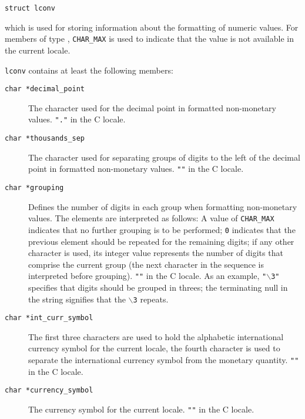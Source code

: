   \begin{Verbatim}
struct lconv
\end{Verbatim}

  which is used for storing information about  the  formatting
   of numeric values.  For members of type \kchar,
   \texttt{CHAR\_MAX} is used to indicate that the value is not available in
   the current locale.


  \texttt{lconv} contains at least the following members:


  \begin{description}
   \item[\texttt{char *decimal\_point}] The character used for the  decimal  point  in  formatted
    non-monetary values.  \texttt{"."} in the C locale.

   \item[\texttt{char *thousands\_sep}] The character used for separating groups of digits to the
    left  of  the  decimal  point  in  formatted non-monetary
    values. \texttt{""} in the C locale.

   \item[\texttt{char *grouping}] Defines  the  number  of  digits  in  each   group   when
    formatting   non-monetary   values.    The  elements  are
    interpreted as follows: A  value  of  \texttt{CHAR\_MAX}  indicates
    that  no further grouping is to be performed; \texttt{0} indicates
    that the previous element  should  be  repeated  for  the
    remaining  digits;  if  any  other character is used, its
    integer  value  represents  the  number  of  digits  that
    comprise  the  current  group  (the next character in the
    sequence is interpreted before grouping).  \texttt{""}  in  the  C
    locale.  As an example, \texttt{"$\backslash$3"} specifies that digits should
    be grouped in threes; the terminating null in the  string
    signifies that the \texttt{$\backslash$3} repeats.

   \item[\texttt{char *int\_curr\_symbol}] The  first  three  characters  are  used  to   hold   the
    alphabetic  international currency symbol for the current
    locale, the fourth character  is  used  to  separate  the
    international currency symbol from the monetary quantity.
    \texttt{""} in the C locale.

   \item[\texttt{char *currency\_symbol}] The currency symbol for the current locale. \texttt{""} in  the  C
    locale.


\end{description}
